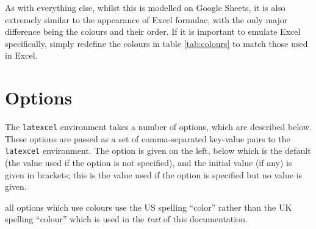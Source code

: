 \documentclass[table]{article}
\newcommand{\semibold}[1]{{\firabook #1}}
\newcommand{\emphasis}[1]{{\color{Red}\semibold{#1}}}
\begin{document}
As with everything else, whilst this is modelled on Google Sheets, it is also extremely similar to the appearance of Excel formulae, with the only major difference being the colours and their order. If it is important to emulate Excel specifically, simply redefine the colours in table \ref{tab:colours} to match those used in Excel.

\section{Options}

The \texttt{latexcel} environment takes a number of options, which are described below. These options are passed as a set of comma-separated key-value pairs to the \texttt{latexcel} environment. The option is given on the left, below which is the default (the value used if the option is not specified), and the initial value (if any) is given in brackets; this is the value used if the option is specified but no value is given.

\emphasis{Note:} all options which use colours use the US spelling ``color'' rather than the UK spelling ``colour'' which is used in the \textit{text} of this documentation.

\end{document}
